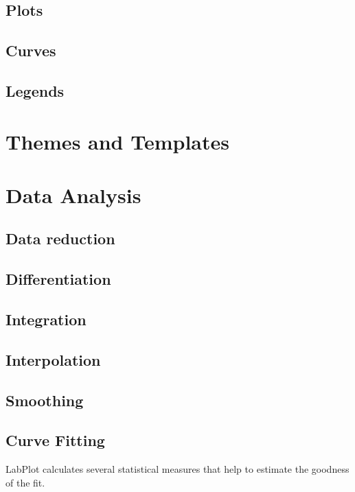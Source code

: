\section{Plots}\label{sec:2d_plots}
\section{Curves}\label{sec:2d_curves}
\section{Legends}\label{sec:2d_legends}



\chapter{Themes and Templates}\label{ch:themes_templates}


\chapter{Data Analysis}\label{ch:data_analysis}
\section{Data reduction}\label{sec:data_reduction}
\section{Differentiation}\label{sec:differentiation}
\section{Integration}\label{sec:integration}
\section{Interpolation}\label{sec:interpolation}
\section{Smoothing}\label{sec:smoothing}
\section{Curve Fitting}\label{sec:curve_fitting}
LabPlot calculates several statistical measures that help to estimate the goodness of the fit.

